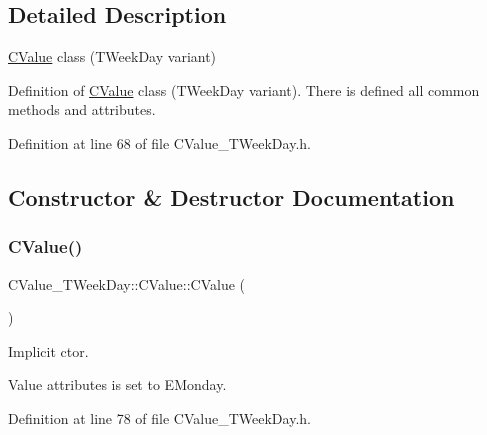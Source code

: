 \subsection{Detailed Description}
\hyperlink{class_c_value___t_week_day_1_1_c_value}{C\+Value} class ({\ttfamily T\+Week\+Day} variant) 

Definition of \hyperlink{class_c_value___t_week_day_1_1_c_value}{C\+Value} class ({\ttfamily T\+Week\+Day} variant). There is defined all common methods and attributes. 

Definition at line 68 of file C\+Value\+\_\+\+T\+Week\+Day.\+h.



\subsection{Constructor \& Destructor Documentation}
\mbox{\label{class_c_value___t_week_day_1_1_c_value_acea76df48114b736ed8002c542e59f0e}} 
\subsubsection{\texorpdfstring{C\+Value()}{CValue()}\hspace{0.1cm}{\footnotesize\ttfamily [1/4]}}
{\footnotesize\ttfamily C\+Value\+\_\+\+T\+Week\+Day\+::\+C\+Value\+::\+C\+Value (\begin{DoxyParamCaption}{ }\end{DoxyParamCaption})\hspace{0.3cm}{\ttfamily [inline]}}



Implicit c\textquotesingle{}tor. 

Value attributes is set to {\ttfamily E\+Monday}. 

Definition at line 78 of file C\+Value\+\_\+\+T\+Week\+Day.\+h.

\mbox{\label{class_c_value___t_week_day_1_1_c_value_a055e113aa1b4725dba3ddb8a7a986061}} 
